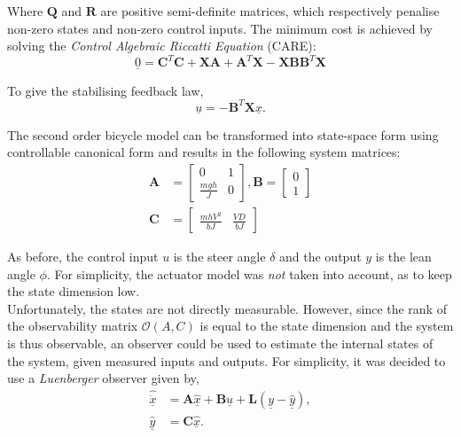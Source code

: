 Where $\mathbf{Q}$ and $\mathbf{R}$ are positive semi-definite matrices, which respectively penalise non-zero states and non-zero control inputs. The minimum cost is achieved by solving the \textit{Control Algebraic Riccatti Equation} (CARE):
\begin{equation*}
\underline{0} = \mathbf{C}^T \mathbf{C} + \mathbf{X} \mathbf{A} + \mathbf{A}^T \mathbf{X} - \mathbf{X} \mathbf{B} \mathbf{B}^T \mathbf{X}
\end{equation*}

To give the stabilising feedback law,
\begin{equation*}
\underline{u} = -\mathbf{B}^T \mathbf{X} \underline{x}.
\end{equation*}

The second order bicycle model can be transformed into state-space form using controllable canonical form and results in the following system matrices:
\begin{align*}
\mathbf{A} &= \begin{bmatrix}
0 & 1 \\
\frac{m g h}{J} & 0
\end{bmatrix}, 
\mathbf{B} = \begin{bmatrix}
0 \\ 1
\end{bmatrix} \\
\mathbf{C} &= \begin{bmatrix}
\frac{m h V^2}{b J} & \frac{V D}{b J}
\end{bmatrix}
\end{align*}

As before, the control input $u$ is the steer angle $\delta$ and the output $y$ is the lean angle $\phi$. For simplicity, the actuator model was \textit{not} taken into account, as to keep the state dimension low. \\

Unfortunately, the states are not directly measurable. However, since the rank of the observability matrix $\mathcal{O}(A,C)$ is equal to the state dimension and the system is thus observable, an observer could be used to estimate the internal states of the system, given measured inputs and outputs. For simplicity, it was decided to use a \textit{Luenberger} observer given by,
\begin{align*}
\underline{\hat{\dot{x}}} &= \mathbf{A} \underline{\hat{x}} + \mathbf{B} \underline{u} + \mathbf{L} (\underline{y} - \underline{\hat{y}}), \\
\underline{\hat{y}} &= \mathbf{C} \underline{\hat{x}}.
\end{align*}

